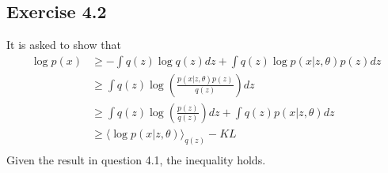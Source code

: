 \documentclass[fleqn]{article}
\begin{document}
\subsection*{Exercise 4.2}
It is asked to show that
\begin{equation}
    \begin{split}
        \log p(x) & \geq - \int q(z) \log q(z) dz + \int q(z) \log p(x | z, \theta) p(z) dz \\
        & \geq \int q(z) \log \left ( \frac{p(x | z, \theta) p(z)}{q(z)} \right ) dz \\
        & \geq \int q(z) \log \left ( \frac{p(z)}{q(z)} \right ) dz + \int q(z) p(x | z, \theta) dz \\
        & \geq \langle \log p(x | z, \theta) \rangle _{q(z)} - KL \\
    \end{split}
\end{equation}
Given the result in question 4.1, the inequality holds.
\end{document}
